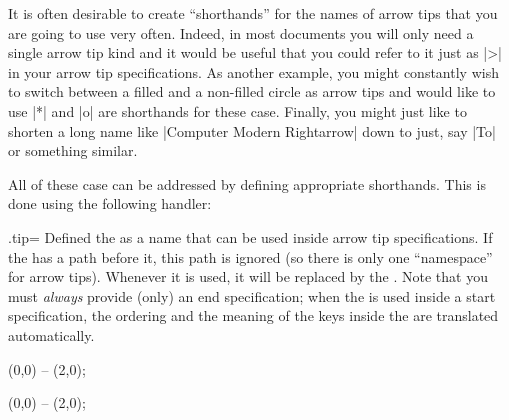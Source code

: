 It is often desirable to create ``shorthands'' for the names of arrow tips that
you are going to use very often. Indeed, in most documents you will only need a
single arrow tip kind and it would be useful that you could refer to it just as
|>| in your arrow tip specifications. As another example, you might constantly
wish to switch between a filled and a non-filled circle as arrow tips and would
like to use |*| and |o| are shorthands for these case. Finally, you might just
like to shorten a long name like |Computer Modern Rightarrow| down to just, say
|To| or something similar.

All of these case can be addressed by defining appropriate shorthands. This is
done using the following handler:

\begin{handler}{{.tip}{=}}
    Defined the  as a name that can be used inside arrow tip
    specifications. If the  has a path before it, this path is
    ignored (so there is only one ``namespace'' for arrow tips). Whenever it is
    used, it will be replaced by the . Note that you
    must \emph{always} provide (only) an end specification; when the 
    is used inside a start specification, the ordering and the meaning of the
    keys inside the  are translated automatically.
\begin{codeexample}[preamble={\usetikzlibrary{arrows.meta}}]
\tikz [foo /.tip = {Stealth[sep]. >>}]
  \draw [-foo] (0,0) -- (2,0);
\end{codeexample}
\begin{codeexample}[preamble={\usetikzlibrary{arrows.meta}}]
\tikz [foo /.tip = {Stealth[sep] Latex[sep]},
       bar /.tip = {Stealth[length=10pt,open]}]
   (0,0) -- (2,0);
\end{codeexample}


\end{handler}
